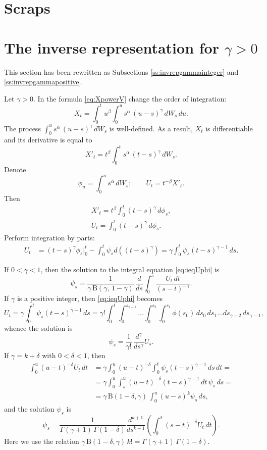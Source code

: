 \documentclass{article}
\theoremstyle{plain}
\theoremstyle{remark}
\theoremstyle{definition}
\begin{document}
\pagebreak

\section*{Scraps}
\section{The inverse representation for $\gamma>0$}
This section has been rewritten as Subsections
\ref{ss:invrepgammainteger} and \ref{ss:invrepgammapositive}.

Let $\gamma>0$.
In the formula \eqref{eq:XpowerV}
change the order of integration:
\[
X_t = \int_0^t u^\beta \int_0^u s^\alpha \, (u-s)^\gamma \, dW_s\, du.
\]
The process $\int_0^u s^\alpha \, (u-s)^\gamma \, dW_s$ is
well-defined. As a result, $X_t$ is differentiable and its
derivative is equal to
\[
X'_t = t^\beta \int_0^t s^\alpha \, (t-s)^\gamma \, dW_s.
\]
Denote
\[
\phi_u = \int_0^u s^\alpha \, dW_s; \qquad
U_t = t^{-\beta} X'_t .
\]
Then
\begin{gather*}
X'_t = t^\beta \int_0^t (t-s)^\gamma \, d\phi_s, \\
U_t = \int_0^t (t-s)^\gamma \, d\phi_s .
\end{gather*}
Perform integration by parts:
\begin{align}
U_t &= (t-s)^\gamma \phi_s \biggr| _0^t - \int_0^t \psi_s d((t-s)^\gamma)
= \gamma \int_0^t \psi_s (t-s)^{\gamma-1} \, ds .
\label{eq:ieqUphi}
\end{align}


If $0<\gamma<1$, then the solution to the integral equation \eqref{eq:ieqUphi} is
\[
\psi_s = \frac{1} {\gamma \, \mathrm{B} (\gamma,\, 1{-}\gamma)} \,
\frac{d}{ds} \int_0^s \frac{U_t \, dt}{(s-t)^{-\gamma}} .
\]
If $\gamma$ is a positive integer, then \eqref{eq:ieqUphi} becomes
\[
U_t = \gamma \int_0^t \psi_s (t-s)^{\gamma-1} \, ds
= \gamma! \int_0^t \int_0^{s_{\gamma-1}} \!\! \dots
\int_0^{s_2} \int_0^{s_1} \phi(s_0) \, ds_0 \, ds_1 \ldots ds_{\gamma-2} \, ds_{\gamma-1},
\]
whence the solution is
\[
\psi_s = \frac{1}{\gamma!} \, \frac{d^\gamma}{ds^\gamma} U_s .
\]
If $\gamma = k + \delta$ with $0 < \delta <1$, then
\begin{align*}
\int_0^u (u-t)^{-\delta} U_t \, dt &= \gamma \int_0^u (u-t)^{-\delta} \int_0^t \psi_s (t-s)^{\gamma-1} \, ds\, dt
= \\ &= \gamma \int_0^u \int_s^u (u-t)^{-\delta} (t-s)^{\gamma-1} \, dt \, \psi_s \, ds
= \\ &= \gamma \, \mathrm{B}(1{-}\delta, \gamma) \, \int_0^u (u-s)^k \psi_s \, ds ,
\end{align*}
and the solution $\psi_s$ is
\[
\psi_s = \frac{1}{\Gamma(\gamma+1) \, \Gamma(1-\delta)}
\frac{d^{k+1}}{ds^{k+1}} \left(
\int_0^s (s-t)^{-\delta} U_t \, dt \right).
\]
Here we use the relation
$\gamma \, \mathrm{B}(1{-}\delta, \gamma) \, k! = \Gamma(\gamma+1) \, \Gamma(1-\delta)$.
\end{document}
